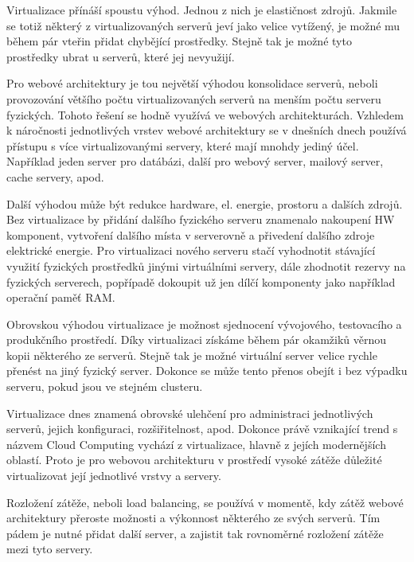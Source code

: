 \documentclass[12pt]{article}
\begin{document}
Virtualizace přínáší spoustu výhod. Jednou z nich je elastičnost zdrojů. Jakmile se totiž některý z virtualizovaných serverů jeví jako velice vytížený, je možné mu během pár vteřin přidat chybějící prostředky. Stejně tak je možné tyto prostředky ubrat u serverů, které jej nevyužijí.

Pro webové architektury je tou největší výhodou konsolidace serverů, neboli provozování většího počtu virtualizovaných serverů na menším počtu serveru fyzických. Tohoto řešení se hodně využívá ve webových architekturách. Vzhledem k náročnosti jednotlivých vrstev webové architektury se v dnešních dnech používá přístupu s více virtualizovanými servery, které mají mnohdy jediný účel. Například jeden server pro datábázi, další pro webový server, mailový server, cache servery, apod.

Další výhodou může být redukce hardware, el. energie, prostoru a dalších zdrojů. Bez virtualizace by přidání dalšího fyzického serveru znamenalo nakoupení HW komponent, vytvoření dalšího místa v serverovně a přivedení dalšího zdroje elektrické energie. Pro virtualizaci nového serveru stačí vyhodnotit stávající využití fyzických prostředků jinými virtuálními servery, dále zhodnotit rezervy na fyzických serverech, popřípadě dokoupit už jen dílčí komponenty jako například operační paměť RAM.

Obrovskou výhodou virtualizace je možnost sjednocení vývojového, testovacího a produkčního prostředí. Díky virtualizaci získáme během pár okamžiků věrnou kopii některého ze serverů. Stejně tak je možné virtuální server velice rychle přenést na jiný fyzický server. Dokonce se může tento přenos obejít i bez výpadku serveru, pokud jsou ve stejném clusteru.

Virtualizace dnes znamená obrovské ulehčení pro administraci jednotlivých serverů, jejich konfiguraci, rozšiřitelnost, apod. Dokonce právě vznikající trend s názvem Cloud Computing vychází z virtualizace, hlavně z jejích modernějších oblastí. Proto je pro webovou architekturu v prostředí vysoké zátěže důležité virtualizovat její jednotlivé vrstvy a servery.\cite{virtual}

\clearpage

\obrazek
{}


\label{sec:load-balancing}
Rozložení zátěže, neboli load balancing, se používá v momentě, kdy zátěž webové architektury přeroste možnosti a výkonnost některého ze svých serverů. Tím pádem je nutné přidat další server, a zajistit tak rovnoměrné rozložení zátěže mezi tyto servery. 
\end{document}
